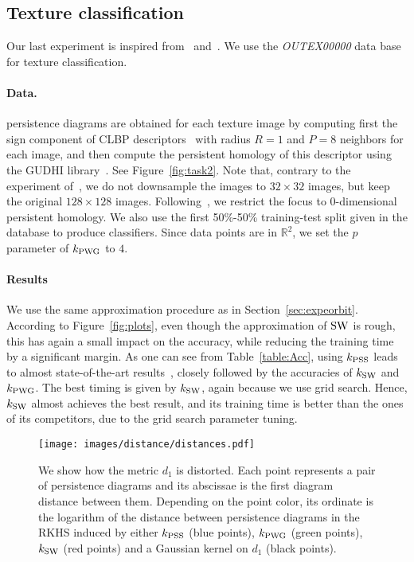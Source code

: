 \documentclass[11pt]{article}
\newcommand{\R}{\mathbb{R}}
\newcommand{\kPSS}{k_{\rm PSS}}
\newcommand{\kPWG}{k_{\rm PWG}}
\newcommand{\kSW}{k_{\rm SW}}
\begin{document}
\subsection{Texture classification}

Our last experiment is inspired from~\cite{Reininghaus15} and~\cite{Li14}. 
We use the \emph{OUTEX00000} data base~\cite{Ojala02} for texture classification. 

\paragraph*{Data.} persistence diagrams are obtained for each texture image by computing first the sign component of CLBP descriptors~\cite{Guo10} 
with radius $R=1$ and $P=8$ neighbors for each image,
and then compute the persistent homology of this descriptor using the GUDHI library~\cite{gudhi}. 
See Figure~\ref{fig:task2}.
Note that, contrary to the experiment of~\cite{Reininghaus15}, we do not downsample the images to $32\times 32$ images,
but keep the original $128\times128$ images. 
Following~\cite{Reininghaus15}, we restrict the focus to 0-dimensional persistent homology.
We also use the first 50\%-50\% training-test split given in the database to produce classifiers. 
Since data points are in $\R^2$, we set the $p$ parameter of $k_{\rm PWG}$ to $4$. 

\paragraph*{Results} We use the same approximation procedure as in Section~\ref{sec:expeorbit}.
According to Figure~\ref{fig:plots}, even though the approximation of ${\rm SW}$ is rough,
this has again a small impact on the accuracy, while reducing the training time by a significant margin.
As one can see from Table~\ref{table:Acc}, 
using $\kPSS$ leads to almost state-of-the-art results~\cite{Ojala02, Guo10},
closely followed by the accuracies of $\kSW$ and $\kPWG$.
The best timing is given by $\kSW$, again because we use grid search. 
Hence, $\kSW$ almost achieves the best result, and its training time is
better than the ones of its competitors, due to the grid search parameter tuning.






\begin{figure}\centering
\texttt{[image: images/distance/distances.pdf]}
\caption{\label{fig:Airplanedistances} We show how the metric $d_1$ is distorted.
Each point represents a pair of persistence diagrams and its abscissae is the first diagram distance between them. 
Depending on the point color, its ordinate is the logarithm of the distance between persistence diagrams in the RKHS induced by either
$\kPSS$ (blue points), $\kPWG$ (green points), $\kSW$ (red points) and a Gaussian kernel on $d_1$ (black points).  }
\end{figure}
\end{document}
